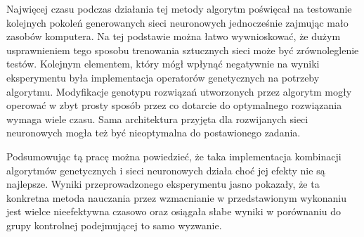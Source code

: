 \documentclass[12pt, oneside, a4paper]{report}
\begin{document}
Najwięcej czasu podczas działania tej metody algorytm poświęcał na testowanie kolejnych pokoleń generowanych sieci neuronowych jednocześnie zajmując mało zasobów komputera. Na tej podstawie można łatwo wywnioskować, że dużym usprawnieniem tego sposobu trenowania sztucznych sieci może być zrównoleglenie testów. Kolejnym elementem, który mógł wpłynąć negatywnie na wyniki eksperymentu była implementacja operatorów genetycznych na potrzeby algorytmu. Modyfikacje genotypu rozwiązań utworzonych przez algorytm mogły operować w zbyt prosty sposób przez co dotarcie do optymalnego rozwiązania wymaga wiele czasu. Sama architektura przyjęta dla rozwijanych sieci neuronowych mogła też być nieoptymalna do postawionego zadania.

Podsumowując tą pracę można powiedzieć, że taka implementacja kombinacji algorytmów genetycznych i sieci neuronowych działa choć jej efekty nie są najlepsze. Wyniki przeprowadzonego eksperymentu jasno pokazały, że ta konkretna metoda nauczania przez wzmacnianie w przedstawionym wykonaniu jest wielce nieefektywna czasowo oraz osiągała słabe wyniki w porównaniu do grupy kontrolnej podejmującej to samo wyzwanie.

\pagebreak


\end{document}
